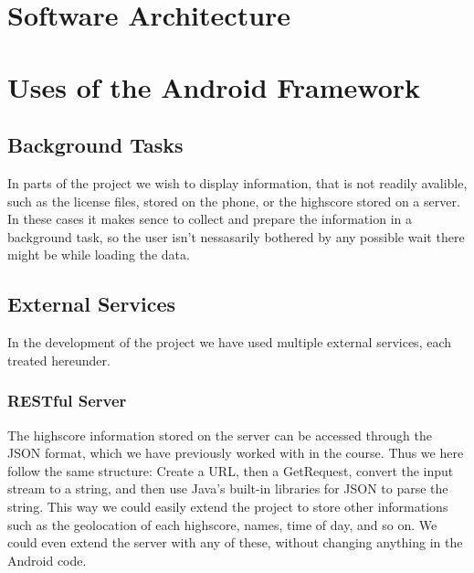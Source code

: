\documentclass[a4paper, 12pt]{article}
\begin{document}
\section{Software Architecture}

\section{Uses of the Android Framework}
\subsection{Background Tasks}
In parts of the project we wish to display information, that is not readily avalible, such as the license files, stored on the phone, or the highscore stored on a server. In these cases it makes sence to collect and prepare the information in a background task, so the user isn't nessasarily bothered by any possible wait there might be while loading the data.

\subsection{External Services}
In the development of the project we have used multiple external services, each treated hereunder.

\subsubsection{RESTful Server}
The highscore information stored on the server can be accessed through the JSON format, which we have previously worked with in the course. Thus we here follow the same structure: Create a URL, then a GetRequest, convert the input stream to a string, and then use Java's built-in libraries for JSON to parse the string. This way we could easily extend the project to store other informations such as the geolocation of each highscore, names, time of day, and so on. We could even extend the server with any of these, without changing anything in the Android code.


\end{document}
